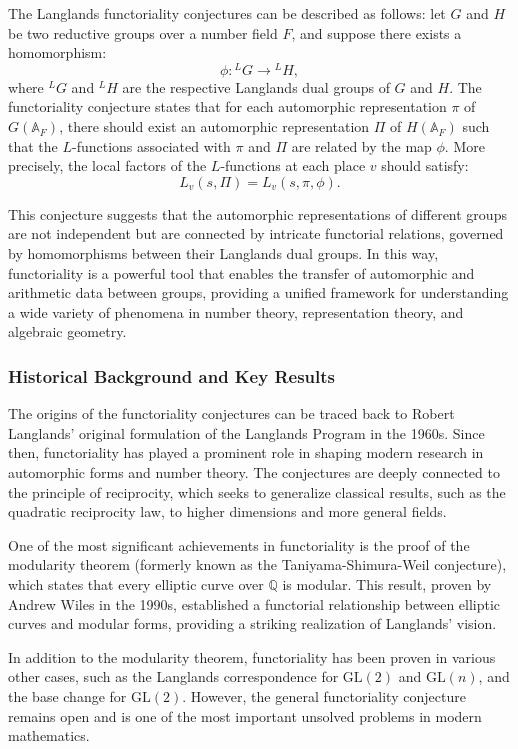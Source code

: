 \documentclass{article}
\theoremstyle{remark}
\begin{document}
The Langlands functoriality conjectures can be described as follows: let $G$ and $H$ be two reductive groups over a number field $F$, and suppose there exists a homomorphism:
\[
\phi: {}^L G \to {}^L H,
\]
where ${}^L G$ and ${}^L H$ are the respective Langlands dual groups of $G$ and $H$. The functoriality conjecture states that for each automorphic representation $\pi$ of $G(\mathbb{A}_F)$, there should exist an automorphic representation $\Pi$ of $H(\mathbb{A}_F)$ such that the $L$-functions associated with $\pi$ and $\Pi$ are related by the map $\phi$. More precisely, the local factors of the $L$-functions at each place $v$ should satisfy:
\[
L_v(s, \Pi) = L_v(s, \pi, \phi).
\]

This conjecture suggests that the automorphic representations of different groups are not independent but are connected by intricate functorial relations, governed by homomorphisms between their Langlands dual groups. In this way, functoriality is a powerful tool that enables the transfer of automorphic and arithmetic data between groups, providing a unified framework for understanding a wide variety of phenomena in number theory, representation theory, and algebraic geometry.

\subsubsection{Historical Background and Key Results}

The origins of the functoriality conjectures can be traced back to Robert Langlands' original formulation of the Langlands Program in the 1960s. Since then, functoriality has played a prominent role in shaping modern research in automorphic forms and number theory. The conjectures are deeply connected to the principle of reciprocity, which seeks to generalize classical results, such as the quadratic reciprocity law, to higher dimensions and more general fields.

One of the most significant achievements in functoriality is the proof of the modularity theorem (formerly known as the Taniyama-Shimura-Weil conjecture), which states that every elliptic curve over $\mathbb{Q}$ is modular. This result, proven by Andrew Wiles in the 1990s, established a functorial relationship between elliptic curves and modular forms, providing a striking realization of Langlands' vision.

In addition to the modularity theorem, functoriality has been proven in various other cases, such as the Langlands correspondence for $\text{GL}(2)$ and $\text{GL}(n)$, and the base change for $\text{GL}(2)$. However, the general functoriality conjecture remains open and is one of the most important unsolved problems in modern mathematics.
\end{document}
